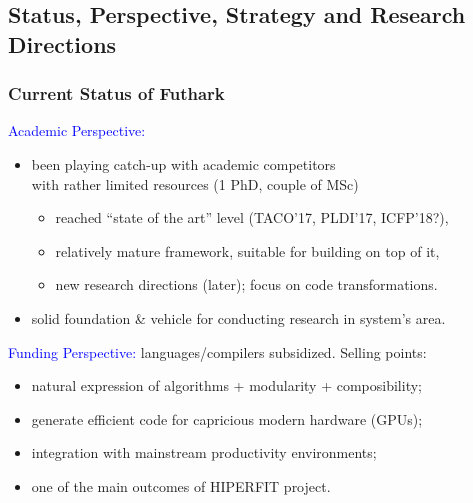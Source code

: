 \documentclass{beamer}
\newcommand{\blue}[1]{\textcolor{Blue}{{#1}}}
\begin{document}
\subsection{Status, Perspective, Strategy and Research Directions}

\begin{frame}[fragile,t]
   \frametitle{Current Status of Futhark}

\blue{Academic Perspective:}\smallskip
\begin{itemize}
    \item been playing catch-up with academic competitors\\ 
            with rather limited resources (1 PhD, couple of MSc)\smallskip
        \begin{itemize}
            \item reached ``state of the art'' level (TACO'17, PLDI'17, ICFP'18?),
            \item relatively mature framework, suitable for building on top of it,
            \item new research directions (later); focus on code transformations.
        \end{itemize}\smallskip
    \item solid foundation \& vehicle for conducting research in system's area.
\end{itemize}
\bigskip

\blue{Funding Perspective:} languages/compilers subsidized. Selling points:\smallskip
\begin{itemize}
    \item natural expression of algorithms + modularity + composibility; \smallskip
    \item generate efficient code for capricious modern hardware (GPUs); \smallskip
    \item integration with mainstream productivity environments;\smallskip
    \item one of the main outcomes of HIPERFIT project.
\end{itemize}

\end{frame}
\end{document}
